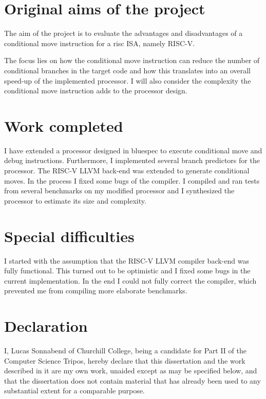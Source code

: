 \documentclass[12pt,twoside,notitlepage]{report}
\begin{document}
\section*{Original aims of the project}

The aim of the project is to evaluate the advantages and disadvantages of a conditional move instruction for a \gls{risc} \gls{ISA}, namely RISC-V. 

The focus lies on how the conditional move instruction can reduce the number of conditional branches in the target code and how this translates into an overall speed-up of the implemented processor. I will also consider the complexity the conditional move instruction adds to the processor design.

\newpage


\section*{Work completed}

I have extended a processor designed in bluespec to execute conditional move and debug instructions. Furthermore, I implemented several branch predictors for the processor. The RISC-V LLVM back-end was extended to generate conditional moves. In the process I fixed some bugs of the compiler. I compiled and ran tests from several benchmarks on my modified processor and I synthesized the processor to estimate its size and complexity.

\section*{Special difficulties}

I started with the assumption that the RISC-V LLVM compiler back-end was fully functional. This turned out to be optimistic and I fixed some bugs in the current implementation. In the end I could not fully correct the compiler, which prevented me from compiling more elaborate benchmarks.

 
\newpage
\section*{Declaration}

I, Lucas Sonnabend of Churchill College, being a candidate for Part II of the Computer
Science Tripos, hereby declare
that this dissertation and the work described in it are my own work,
unaided except as may be specified below, and that the dissertation
does not contain material that has already been used to any substantial
extent for a comparable purpose.
\end{document}
